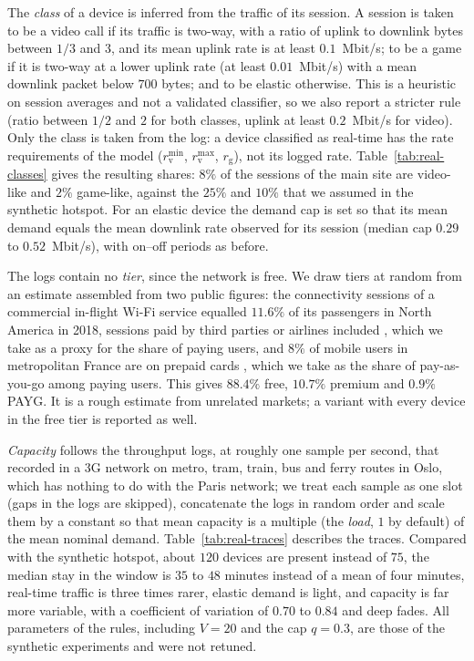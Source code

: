 \documentclass[preprint,11pt]{elsarticle}
\theoremstyle{definition}
\theoremstyle{remark}
\newcommand{\rmin}{r^{\min}}
\newcommand{\rmax}{r^{\max}}
\begin{document}
The \emph{class} of a device is inferred from the traffic of its session.
A session is taken to be a video call if its traffic is two-way, with a ratio of uplink to downlink bytes between $1/3$ and $3$, and its mean uplink rate is at least $0.1$~Mbit/s; to be a game if it is two-way at a lower uplink rate (at least $0.01$~Mbit/s) with a mean downlink packet below $700$ bytes; and to be elastic otherwise.
This is a heuristic on session averages and not a validated classifier, so we also report a stricter rule (ratio between $1/2$ and $2$ for both classes, uplink at least $0.2$~Mbit/s for video).
Only the class is taken from the log: a device classified as real-time has the rate requirements of the model ($\rmin_{\mathrm{v}}$, $\rmax_{\mathrm{v}}$, $r_{\mathrm{g}}$), not its logged rate.
Table~\ref{tab:real-classes} gives the resulting shares: $8\%$ of the sessions of the main site are video-like and $2\%$ game-like, against the $25\%$ and $10\%$ that we assumed in the synthetic hotspot.
For an elastic device the demand cap is set so that its mean demand equals the mean downlink rate observed for its session (median cap $0.29$ to $0.52$~Mbit/s), with on--off periods as before.

The logs contain no \emph{tier}, since the network is free.
We draw tiers at random from an estimate assembled from two public figures: the connectivity sessions of a commercial in-flight Wi-Fi service equalled $11.6\%$ of its passengers in North America in 2018, sessions paid by third parties or airlines included \citep{gogo2019tenk}, which we take as a proxy for the share of paying users, and $8\%$ of mobile users in metropolitan France are on prepaid cards \citep{arcep2026mobile}, which we take as the share of pay-as-you-go among paying users.
This gives $88.4\%$ free, $10.7\%$ premium and $0.9\%$ PAYG. It is a rough estimate from unrelated markets; a variant with every device in the free tier is reported as well.

\emph{Capacity} follows the throughput logs, at roughly one sample per second, that \citet{riiser2013commute} recorded in a 3G network on metro, tram, train, bus and ferry routes in Oslo, which has nothing to do with the Paris network; we treat each sample as one slot (gaps in the logs are skipped), concatenate the logs in random order and scale them by a constant so that mean capacity is a multiple (the \emph{load}, $1$ by default) of the mean nominal demand.
Table~\ref{tab:real-traces} describes the traces.
Compared with the synthetic hotspot, about $120$ devices are present instead of $75$, the median stay in the window is $35$ to $48$ minutes instead of a mean of four minutes, real-time traffic is three times rarer, elastic demand is light, and capacity is far more variable, with a coefficient of variation of $0.70$ to $0.84$ and deep fades.
All parameters of the rules, including $V=20$ and the cap $q=0.3$, are those of the synthetic experiments and were not retuned.
\end{document}
